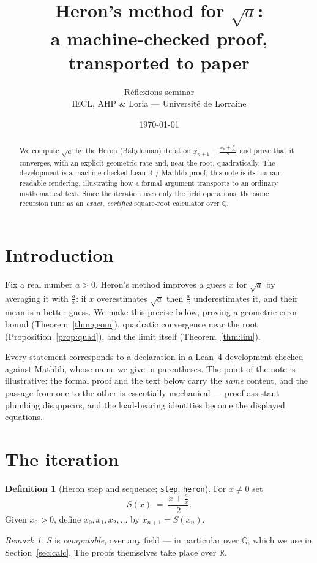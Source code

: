 \documentclass[11pt]{article}
\title{Heron's method for $\sqrt{a}$:\\[2pt]
       \large a machine-checked proof, transported to paper}
\author{R\'eflexions seminar\\ \small IECL, AHP \& Loria --- Universit\'e de Lorraine}
\date{\today}
\theoremstyle{plain}
\theoremstyle{definition}
\newtheorem{definition}[theorem]{Definition}
\theoremstyle{remark}
\newtheorem*{remark}{Remark}
\newcommand{\R}{\mathbb{R}}
\newcommand{\Q}{\mathbb{Q}}
\begin{document}
\maketitle

\begin{abstract}
We compute $\sqrt{a}$ by the Heron (Babylonian) iteration $x_{n+1}=\frac{x_n+\frac{a}{x_n}}{2}$ and
prove that it converges, with an explicit geometric rate and, near the root,
quadratically. The development is a machine-checked Lean~4 / Mathlib proof; this note is
its human-readable rendering, illustrating how a formal argument transports to an ordinary
mathematical text. Since the iteration uses only the field operations, the same recursion
runs as an \emph{exact, certified} square-root calculator over $\Q$.
\end{abstract}

\section{Introduction}

Fix a real number $a>0$. Heron's method improves a guess $x$ for $\sqrt{a}$ by averaging it
with $\frac{a}{x}$: if $x$ overestimates $\sqrt{a}$ then $\frac{a}{x}$ underestimates it, and their mean is
a better guess. We make this precise below, proving a geometric error bound
(Theorem~\ref{thm:geom}), quadratic convergence near the root (Proposition~\ref{prop:quad}),
and the limit itself (Theorem~\ref{thm:lim}).

Every statement corresponds to a declaration in a Lean~4 development checked against
Mathlib, whose name we give in parentheses. The point of the note is illustrative: the
formal proof and the text below carry the \emph{same} content, and the passage from one to
the other is essentially mechanical --- proof-assistant plumbing disappears, and the
load-bearing identities become the displayed equations.

\section{The iteration}

\begin{definition}[Heron step and sequence; \texttt{step}, \texttt{heron}]
For $x\neq 0$ set
\[
  S(x)\;=\;\frac{x+\frac{a}{x}}{2}.
\]
Given $x_0>0$, define $x_0,x_1,x_2,\dots$ by $x_{n+1}=S(x_n)$.
\end{definition}

\begin{remark}
$S$ is \emph{computable}, over any field --- in particular over $\Q$, which we use in Section~\ref{sec:calc}.
The proofs themselves take place over $\R$.
\end{remark}
\end{document}
